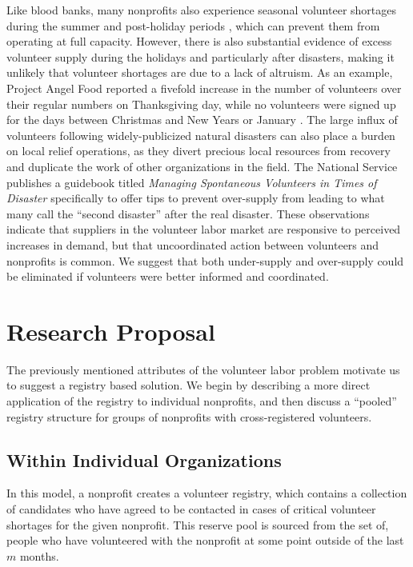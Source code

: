 \documentclass[11pt, margin=1in]{article}
\begin{document}
Like blood banks, many nonprofits also experience seasonal volunteer shortages during the summer and post-holiday periods \cite{angel-food, maryland-food}, which can prevent them from operating at full capacity. However, there is also substantial evidence of excess volunteer supply during the holidays and particularly after disasters, making it unlikely that volunteer shortages are due to a lack of altruism. As an example, Project Angel Food reported a fivefold increase in the number of volunteers over their regular numbers on Thanksgiving day, while no volunteers were signed up for the days between Christmas and New Years or January \cite{angel-food}. The large influx of volunteers following widely-publicized natural disasters can also place a burden on local relief operations, as they divert precious local resources from recovery and duplicate the work of other organizations in the field. The National Service publishes a guidebook titled \textit{Managing Spontaneous Volunteers in Times of Disaster} \cite{managing-volunteers} specifically to offer tips to prevent over-supply from leading to what many call the ``second disaster'' after the real disaster. These observations indicate that suppliers in the volunteer labor market are responsive to perceived increases in demand, but that uncoordinated action between volunteers and nonprofits is common. We suggest that both under-supply and over-supply could be eliminated if volunteers were better informed and coordinated.

\section{Research Proposal}
The previously mentioned attributes of the volunteer labor problem motivate us to suggest a registry based solution. We begin by describing a more direct application of the registry to individual nonprofits, and then discuss a ``pooled'' registry structure for groups of nonprofits with cross-registered volunteers.

\subsection{Within Individual Organizations}
In this model, a nonprofit creates a volunteer registry, which contains a collection of candidates who have agreed to be contacted in cases of critical volunteer shortages for the given nonprofit. This reserve pool is sourced from the set of, people who have volunteered with the nonprofit at some point outside of the last $m$ months.
\end{document}
